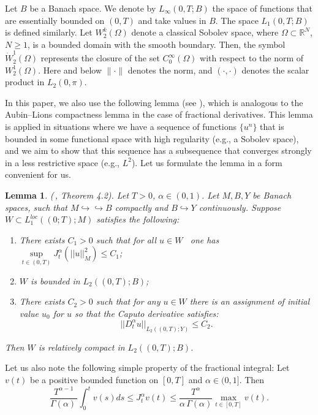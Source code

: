 \documentclass[12pt]{amsart}
\newtheorem{lem}[thm]{Lemma}
\theoremstyle{definition}
\numberwithin{equation}{section}
\begin{document}
Let \( B \) be a Banach space. We denote by \( L_\infty(0, T; B) \) the space of functions that are essentially bounded on \( (0, T) \) and take values in \( B \). The space \( L_1(0, T; B) \) is defined similarly. Let \( W_2^k(\Omega) \) denote a classical Sobolev space, where $\Omega\subset \mathbb{R}^N$, $N\geq 1$, is a bounded domain with the smooth boundary. Then, the symbol \( \dot{W}_2^1(\Omega) \) represents the closure of the set \( C_0^\infty(\Omega) \) with respect to the norm of \( W_2^1(\Omega) \). Here and below \( \|\cdot\| \) denotes the norm, and $(\cdot, \cdot)$ denotes the scalar product in \( L_2(0, \pi) \).


In this paper, we also use the following lemma (see \cite{LiLiu}), which is analogous to the Aubin–Lions compactness lemma in the case of fractional derivatives. This lemma is applied in situations where we have a sequence of functions \( \{u^n\} \) that is bounded in some functional space with high regularity (e.g., a Sobolev space), and we aim to show that this sequence has a subsequence that converges strongly in a less restrictive space (e.g., \( L^2 \)). Let us formulate the lemma in a form convenient for us.
\begin{lem}\label{li} (\,\cite{LiLiu}, Theorem 4.2). Let $T > 0$, $\alpha \in (0, 1)$. Let $M,  B, Y$  be Banach
spaces, such that  $M \hookrightarrow \hookrightarrow  B$ compactly and $B \hookrightarrow Y$ continuously. Suppose $W \subset L_1^{loc} ((0; T ); M)$ satisfies the following:
\begin{enumerate}
    \item There exists $C_1>0$ such that for all \( u \in W \) \, one has \, \(\sup\limits_{t\in (0, T)}  J_t^\alpha(||u||^2_M) \leq C_1 \);
    \item \( W \) is bounded in \( L_2((0,T); B)\);
    \item There exists $C_2 > 0$ such that for any $u \in W$ there is an assignment of initial value $u_0$ for $u$ so that the  Caputo derivative satisfies:
    \[
    ||D^\alpha_t u||_{L_2((0,T); Y)} \leq C_2.
    \]
\end{enumerate}
Then $W$ is relatively compact in $L_2((0, T); B)$.
\end{lem}


Let us also note the following simple property of the fractional integral: Let $v(t)$ be a positive bounded function on $[0, T]$ and $\alpha\in (0,1]$. Then
\begin{equation}\label{integral}
\frac{T^{\alpha -1 }}{\Gamma(\alpha)\, }\int_0^tv(s) ds \leq J_t^\alpha v(t)\leq \frac{T^\alpha}{\alpha\, \Gamma(\alpha)} \max\limits_{t\in [0,T]} v(t).
\end{equation}
\end{document}
